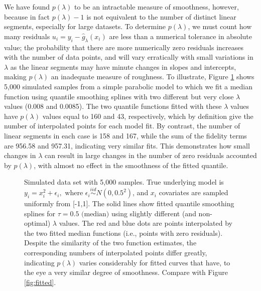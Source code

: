 \documentclass{statsoc}
\begin{document}
 We have found $p(\lambda)$ to be an intractable measure of smoothness, however, because in fact $p(\lambda)-1$ is not equivalent to the number of distinct linear segments, especially for large datasets. To determine $p(\lambda)$, we must count how many residuals $u_i=y_i-\hat g_{\lambda}(x_i)$ are less than a numerical tolerance in absolute value;  the probability that there are more numerically zero residuals increases with the number of data points, and will vary erratically with small variations in $\lambda$ as the linear segments may have minute changes in slopes and intercepts, making $p(\lambda)$ an inadequate measure of roughness.  To illustrate, Figure \ref{fig:edf} shows 5,000 simulated samples from a simple parabolic model to which we fit a median function using quantile smoothing splines with two different but very close $\lambda$ values  {(0.008 and 0.0085)}. The two quantile functions fitted with these $\lambda$ values have  $p(\lambda)$  values equal to 160 and 43, respectively, which by definition give the number of interpolated points for each model fit.  By contrast, the number of linear segments in each case is 158 and 167, while the sum of the fidelity terms are 956.58 and 957.31, indicating very similar fits. This demonstrates how small changes in $\lambda$ can result in large changes in the number of zero residuals accounted by $p(\lambda)$, with almost no effect in the smoothness of the fitted quantile.  
\begin{figure}
\centering   
\caption{Simulated data set with 5,000 samples. True underlying model is $y_i=x_i^2+\epsilon_i,\text{ where }\epsilon_i\stackrel{iid}{\sim} N(0,0.5^2)$, and $x_i$ covariates are sampled uniformly from [-1,1]. The  {solid lines} show fitted quantile smoothing splines for $\tau=0.5 \text{ (median)}$ using slightly different (and non-optimal) $\lambda$ values. The red and blue  {dots are points} interpolated by the two fitted median functions (i.e., points with zero residuals). Despite the similarity of the two function estimates, the corresponding numbers of interpolated points differ greatly, indicating $p(\lambda)$ varies considerably for fitted curves that have,  {to the eye} a very similar degree of smoothness. Compare with Figure \ref{fig:fitted}.}
\label{fig:edf}
\end{figure}
\end{document}
